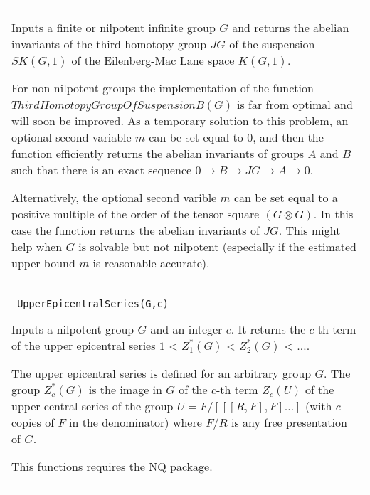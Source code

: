\documentclass[a4paper,11pt]{report}
\begin{document}
{\begin{center}
\begin{tabular}{|l|}
 Inputs a finite or nilpotent infinite group $G$ and returns the abelian invariants of the third homotopy group $JG$ of the suspension $SK(G,1)$ of the Eilenberg-Mac Lane space $K(G,1)$. 

 For non-nilpotent groups the implementation of the function $ThirdHomotopyGroupOfSuspensionB(G)$ is far from optimal and will soon be improved. As a temporary solution to this
problem, an optional second variable $m$ can be set equal to $0$, and then the function efficiently returns the abelian invariants of groups $A$ and $B$ such that there is an exact sequence $0 \longrightarrow B \longrightarrow JG \longrightarrow A \longrightarrow 0$. 

 Alternatively, the optional second varible $m$ can be set equal to a positive multiple of the order of the tensor square $(G \otimes G)$. In this case the function returns the abelian invariants of $JG$. This might help when $G$ is solvable but not nilpotent (especially if the estimated upper bound $m$ is reasonable accurate). \\
 \index{UpperEpicentralSeries} \texttt{ UpperEpicentralSeries(G,c) } 

 Inputs a nilpotent group $G$ and an integer $c$. It returns the $c$-th term of the upper epicentral series $1$ {\textless} $ Z_1^\ast(G)$ {\textless} $Z_2^\ast(G)$ {\textless} $ \ldots $. 

 The upper epicentral series is defined for an arbitrary group $G$. The group $Z_c^\ast (G)$ is the image in $G$ of the $c$-th term $Z_c(U)$ of the upper central series of the group $U=F/[[[R,F],F] \ldots ]$ (with $c$ copies of $F$ in the denominator) where $F/R$ is any free presentation of $G$. 

 This functions requires the NQ package. \\
\end{tabular}\\[2mm]
\end{center}

 }

 
\end{document}

